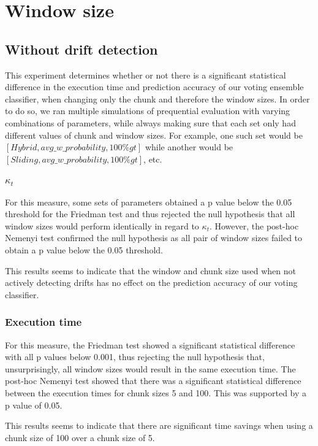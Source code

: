 \section{Window size}
\subsection{Without drift detection}
This experiment determines whether or not there is a significant statistical difference in the execution time and prediction accuracy of our voting ensemble classifier, when changing only the chunk and therefore the window sizes. In order to do so, we ran multiple simulations of prequential evaluation with varying combinations of parameters, while always making sure that each set only had different values of chunk and window sizes.
For example, one such set would be $[Hybrid,avg\_w\_probability,100\%gt]$ while another would be $[Sliding,avg\_w\_probability,100\%gt]$, etc.

\subsubsection{$\kappa_t$}
For this measure, some sets of parameters obtained a p value below the 0.05 threshold for the Friedman test and thus rejected the null hypothesis that all window sizes would perform identically in regard to $\kappa_t$. However, the post-hoc Nemenyi test confirmed the null hypothesis as all pair of window sizes failed to obtain a p value below the 0.05 threshold.

This results seems to indicate that the window and chunk size used when not actively detecting drifts has no effect on the prediction accuracy of our voting classifier.

\subsubsection{Execution time}
For this measure, the Friedman test showed a significant statistical difference with all p values below 0.001, thus rejecting the null hypothesis that, unsurprisingly, all window sizes would result in the same execution time. The post-hoc Nemenyi test showed that there was a significant statistical difference between the execution times for chunk sizes 5 and 100. This was supported by a p value of 0.05.

This results seems to indicate that there are significant time savings when using a chunk size of 100 over a chunk size of 5.

